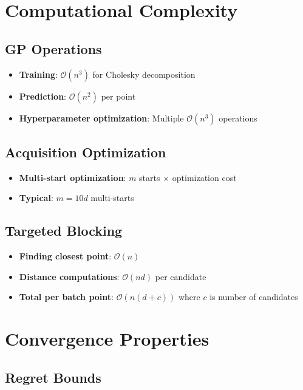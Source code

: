 \documentclass[11pt,a4paper]{article}
\begin{document}
\section{Computational Complexity}

\subsection{GP Operations}

\begin{itemize}
    \item \textbf{Training}: $\mathcal{O}(n^3)$ for Cholesky decomposition
    \item \textbf{Prediction}: $\mathcal{O}(n^2)$ per point
    \item \textbf{Hyperparameter optimization}: Multiple $\mathcal{O}(n^3)$ operations
\end{itemize}

\subsection{Acquisition Optimization}

\begin{itemize}
    \item \textbf{Multi-start optimization}: $m$ starts $\times$ optimization cost
    \item \textbf{Typical}: $m = 10d$ multi-starts
\end{itemize}

\subsection{Targeted Blocking}

\begin{itemize}
    \item \textbf{Finding closest point}: $\mathcal{O}(n)$
    \item \textbf{Distance computations}: $\mathcal{O}(nd)$ per candidate
    \item \textbf{Total per batch point}: $\mathcal{O}(n(d + c))$ where $c$ is number of candidates
\end{itemize}

\section{Convergence Properties}

\subsection{Regret Bounds}
\end{document}
